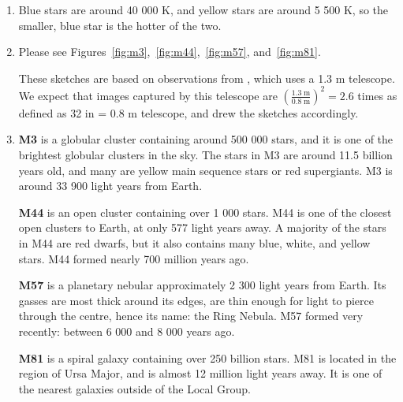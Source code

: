 \documentclass[11pt]{article}
\begin{document}
\begin{enumerate}[label={\textbf{\emph{(\arabic*)}}}]
	\item %
Blue stars are around 40 000 K, and yellow stars are around 5 500 K, so the smaller, blue star is the hotter of the two.

	\item %
Please see Figures~\ref{fig:m3},~\ref{fig:m44},~\ref{fig:m57}, and~\ref{fig:m81}.

These sketches are based on observations from \cite{2mass}, which uses a 1.3 m telescope.
We expect that images captured by this telescope are $\left(\frac{1.3\;\textrm{m}}{0.8\;\textrm{m}}\right)^2 = 2.6$ times as defined as 32 in = 0.8 m telescope, and drew the sketches accordingly.

	\item %
\textbf{M3} is a globular cluster containing around 500 000 stars, and it is one of the brightest globular clusters in the sky.
The stars in M3 are around 11.5 billion years old, and many are yellow main sequence stars or red supergiants.
M3 is around 33 900 light years from Earth.
\cite{messier3}

\textbf{M44} is an open cluster containing over 1 000 stars.
M44 is one of the closest open clusters to Earth, at only 577 light years away.
A majority of the stars in M44 are red dwarfs, but it also contains many blue, white, and yellow stars.
M44 formed nearly 700 million years ago.
\cite{messier44}

\textbf{M57} is a planetary nebular approximately 2 300 light years from Earth.
Its gasses are most thick around its edges, are thin enough for light to pierce through the centre, hence its name: the Ring Nebula.
M57 formed very recently: between 6 000 and 8 000 years ago.
\cite{messier57}

\textbf{M81} is a spiral galaxy containing over 250 billion stars.
M81 is located in the region of Ursa Major, and is almost 12 million light years away.
It is one of the nearest galaxies outside of the Local Group.
\cite{messier81}

\end{enumerate}
\end{document}
